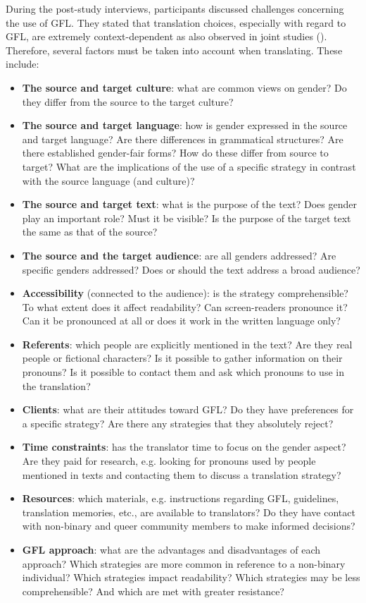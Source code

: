 During the post-study interviews, participants discussed challenges concerning the use of GFL. They stated that translation choices, especially with regard to GFL, are extremely context-dependent as also observed in joint studies (\cite{burtscher-2022-genderfairmt,gromann2023participatory}). Therefore, several factors must be taken into account when translating. These include: 
\begin{itemize}
\setlength\itemsep{-0.5em}
    \item \textbf{The source and target culture}: what are common views on gender? Do they differ from the source to the target culture?
    \item \textbf{The source and target language}: how is gender expressed in the source and target language? Are there differences in grammatical structures? Are there established gender-fair forms? How do these differ from source to target? What are the implications of the use of a specific strategy in contrast with the source language (and culture)? 
    \item \textbf{The source and target text}: what is the purpose of the text? Does gender play an important role? Must it be visible? Is the purpose of the target text the same as that of the source?
    \item \textbf{The source and the target audience}: are all genders addressed? Are specific genders addressed? Does or should the text address a broad audience?
    \item \textbf{Accessibility} (connected to the audience): is the strategy comprehensible? To what extent does it affect readability? Can screen-readers pronounce it? Can it be pronounced at all or does it work in the written language only?
    \item \textbf{Referents}: which people are explicitly mentioned in the text? Are they real people or fictional characters? Is it possible to gather information on their pronouns? Is it possible to contact them and ask which pronouns to use in the translation? 
    \item \textbf{Clients}: what are their attitudes toward GFL? Do they have preferences for a specific strategy? Are there any strategies that they absolutely reject?
    \item \textbf{Time constraints}: has the translator time to focus on the gender aspect? Are they paid for research, e.g. looking for pronouns used by people mentioned in texts and contacting them to discuss a translation strategy?
    \item \textbf{Resources}: which materials, e.g. instructions regarding GFL, guidelines, translation memories, etc., are available to translators? Do they have contact with non-binary and queer community members to make informed decisions?
    \item \textbf{GFL approach}: what are the advantages and disadvantages of each approach? Which strategies are more common in reference to a non-binary individual? Which strategies impact readability? Which strategies may be less comprehensible? And which are met with greater resistance?
\end{itemize}
